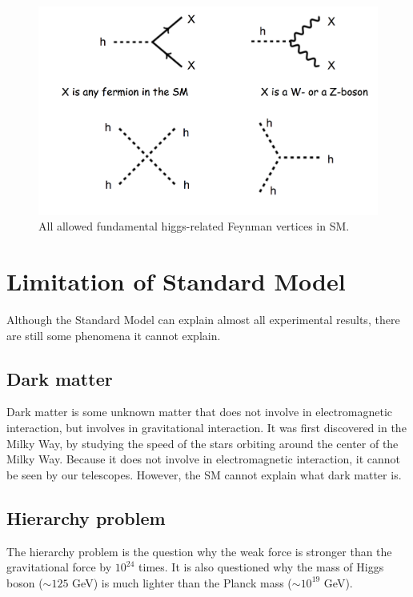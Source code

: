 \begin{figure}
\centering
\includegraphics[width=\textwidth]{data/photo/theory/vertices_higgs.png}
\caption{All allowed fundamental higgs-related Feynman vertices in SM.}
\label{fig:vertices_higgs}
\end{figure}

\section{Limitation of Standard Model}
\label{sec:Limitation_Standard_Model}
Although the Standard Model can explain almost all experimental results, there are still some phenomena it cannot explain.

\subsection{Dark matter}
\label{sec:dark_matter}
Dark matter is some unknown matter that does not involve in electromagnetic interaction, but involves in gravitational interaction.
It was first discovered in the Milky Way, by studying the speed of the stars orbiting around the center of the Milky Way.
Because it does not involve in electromagnetic interaction, it cannot be seen by our telescopes.
However, the SM cannot explain what dark matter is.

\subsection{Hierarchy problem}
\label{subsec:hierarchy_problem}
The hierarchy problem is the question why the weak force is stronger than the gravitational force by $10^{24}$ times.
It is also questioned why the mass of Higgs boson ($\sim 125$ GeV) is much lighter than the Planck mass ($\sim 10^{19}$ GeV).

